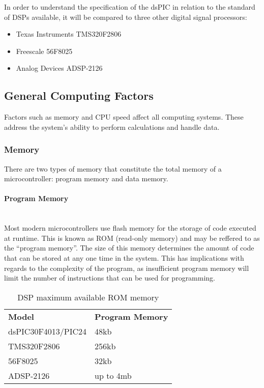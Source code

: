 \documentclass[titlepage]{scrartcl}
\begin{document}
    In order to understand the specification of the dsPIC in relation to the
    standard of DSPs available, it will be compared to three other digital signal
    processors:
    \begin{itemize}
        \item Texas Instruments TMS320F2806
        \item Freescale 56F8025
        \item Analog Devices ADSP-2126
    \end{itemize}

    \subsection{General Computing Factors}
    Factors such as memory and CPU speed affect all computing systems. These
    address the system's ability to perform calculations and handle data.

    \subsubsection{Memory}
    There are two types of memory that constitute the total memory of a
    microcontroller: program memory and data memory.

    \paragraph{Program Memory}~\\
    Most modern microcontrollers use flash memory for the storage of code
    executed at runtime. This is known as ROM (read-only memory) and may be
    reffered to as the ``program memory''. The size of this memory determines
    the amount of code that can be stored at any one time in the system.
    This has implications with regards to the complexity of the program, as
    insufficient program memory will limit the number of instructions that can
    be used for programming.~\parencite[p.317]{raf2014fdlm}

    \begin{table}[H]
    \centering
    \caption{DSP maximum available ROM memory}
    \label{my-label}
    \begin{tabular}{ll}
        \textbf{Model}     & \textbf{Program Memory}\\
        dsPIC30F4013/PIC24 & 48kb      \\
        TMS320F2806        & 256kb     \\
        56F8025            & 32kb      \\
        ADSP-2126          & up to 4mb
    \end{tabular}
    \end{table}
\end{document}
